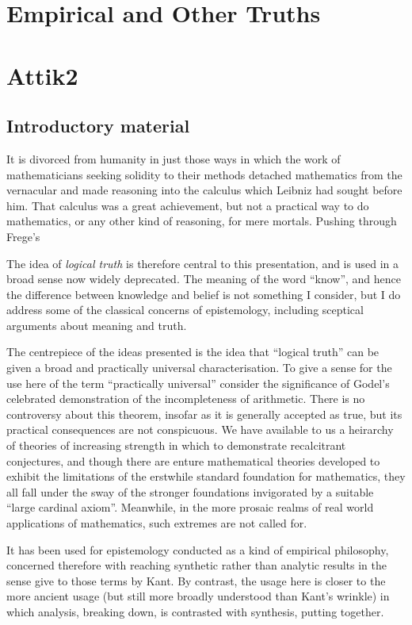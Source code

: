 \documentclass[10pt,titlepage]{book}
\begin{document}
\chapter{Empirical and Other Truths}


\chapter{Attik2}

\section{Introductory material}

It is divorced from humanity in just those ways in which the work of mathematicians seeking solidity to their methods detached mathematics from the vernacular and made reasoning into the calculus which Leibniz had sought before him.
That calculus was a great achievement, but not a practical way to do mathematics, or any other kind of reasoning, for mere mortals.
Pushing through Frege's



The idea of \emph{logical truth} is therefore central to this presentation, and is used in a broad sense now widely deprecated.
The meaning of the word ``know'', and hence the difference between knowledge and belief is not something I consider, but I do address some of the classical concerns of epistemology, including sceptical arguments about meaning and truth.

The centrepiece of the ideas presented is the idea that ``logical truth'' can be given a broad and practically universal characterisation.
To give a sense for the use here of the term ``practically universal'' consider the significance of Godel's celebrated demonstration of the incompleteness of arithmetic.
There is no controversy about this theorem, insofar as it is generally accepted as true, but its practical consequences are not conspicuous.
We have available to us a heirarchy of theories of increasing strength in which to demonstrate recalcitrant conjectures, and though there are enture mathematical theories developed to exhibit the limitations of the erstwhile standard foundation for mathematics, they all fall under the sway of the stronger foundations invigorated by a suitable ``large cardinal axiom''.
Meanwhile, in the more prosaic realms of real world applications of mathematics, such extremes are not called for.


It has been used for epistemology conducted as a kind of empirical philosophy, concerned therefore with reaching synthetic rather than analytic results in the sense give to those terms by Kant.
By contrast, the usage here is closer to the more ancient usage (but still more broadly understood than Kant's wrinkle) in which analysis, breaking down, is contrasted with synthesis, putting together.
\end{document}
